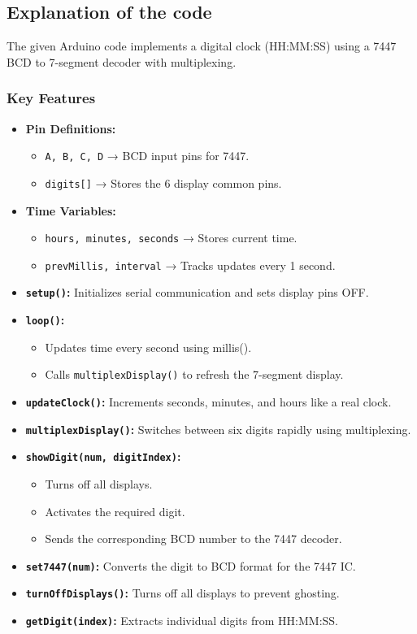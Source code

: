 \documentclass{article}
\begin{document}
\subsection{Explanation of the code}

The given Arduino code implements a digital clock (HH:MM:SS) using a 7447 BCD to 7-segment decoder with multiplexing.

\subsubsection{Key Features}
\begin{itemize}
    \item \textbf{Pin Definitions:}  
    \begin{itemize}
        \item \texttt{A, B, C, D} → BCD input pins for 7447.
        \item \texttt{digits[]} → Stores the 6 display common pins.
    \end{itemize}
    \item \textbf{Time Variables:}  
    \begin{itemize}
        \item \texttt{hours, minutes, seconds} → Stores current time.
        \item \texttt{prevMillis, interval} → Tracks updates every 1 second.
    \end{itemize}
    \item \textbf{\texttt{setup()}:} Initializes serial communication and sets display pins OFF.
    \item \textbf{\texttt{loop()}:} 
    \begin{itemize}
        \item Updates time every second using millis().
        \item Calls \texttt{multiplexDisplay()} to refresh the 7-segment display.
    \end{itemize}
    \item \textbf{\texttt{updateClock()}:} Increments seconds, minutes, and hours like a real clock.
    \item \textbf{\texttt{multiplexDisplay()}:} Switches between six digits rapidly using multiplexing.
    \item \textbf{\texttt{showDigit(num, digitIndex)}:}  
    \begin{itemize}
        \item Turns off all displays.
        \item Activates the required digit.
        \item Sends the corresponding BCD number to the 7447 decoder.
    \end{itemize}
    \item \textbf{\texttt{set7447(num)}:} Converts the digit to BCD format for the 7447 IC.
    \item \textbf{\texttt{turnOffDisplays()}:} Turns off all displays to prevent ghosting.
    \item \textbf{\texttt{getDigit(index)}:} Extracts individual digits from HH:MM:SS.
\end{itemize}
\end{document}
